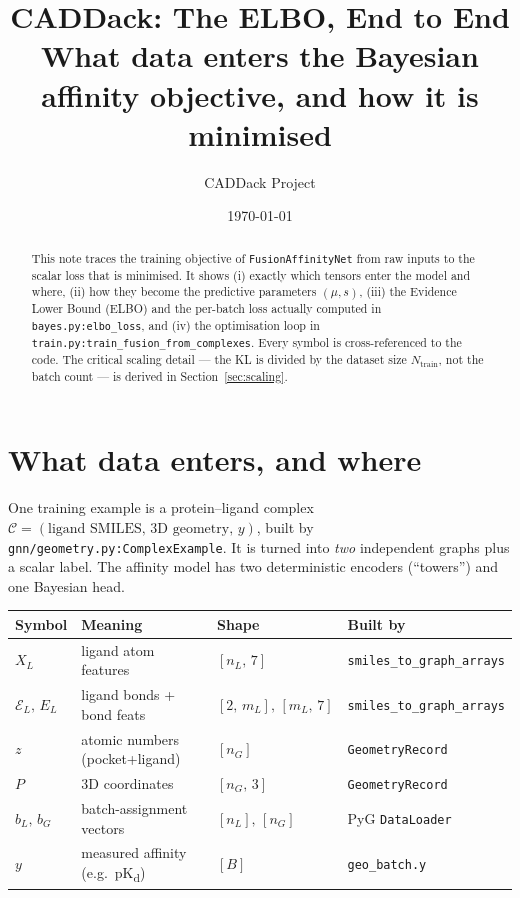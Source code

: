 \documentclass[11pt,a4paper]{article}
\title{%
  \textbf{CADDack: The ELBO, End to End}\\[6pt]
  \large What data enters the Bayesian affinity objective, and how it is minimised
}
\author{CADDack Project}
\date{\today}
\newcommand{\code}[1]{\texttt{#1}}
\begin{document}
\maketitle
\thispagestyle{fancy}

\begin{abstract}
This note traces the training objective of \code{FusionAffinityNet} from raw inputs
to the scalar loss that is minimised. It shows (i) exactly which tensors enter the
model and where, (ii) how they become the predictive parameters $(\mu, s)$, (iii)
the Evidence Lower Bound (ELBO) and the per-batch loss actually computed in
\code{bayes.py:elbo\_loss}, and (iv) the optimisation loop in
\code{train.py:train\_fusion\_from\_complexes}. Every symbol is cross-referenced to
the code. The critical scaling detail --- the KL is divided by the dataset size
$N_{\text{train}}$, not the batch count --- is derived in Section~\ref{sec:scaling}.
\end{abstract}

\section{What data enters, and where}
\label{sec:data}

One training example is a protein--ligand complex
$\mathcal{C} = (\text{ligand SMILES},\, \text{3D geometry},\, y)$, built by
\code{gnn/geometry.py:ComplexExample}. It is turned into \emph{two} independent
graphs plus a scalar label. The affinity model has two deterministic encoders
(``towers'') and one Bayesian head.

\begin{center}
\small
\renewcommand{\arraystretch}{1.35}
\begin{tabular}{@{}p{2.6cm}p{4.2cm}p{2.4cm}p{4.0cm}@{}}
\toprule
\textbf{Symbol} & \textbf{Meaning} & \textbf{Shape} & \textbf{Built by} \\
\midrule
$X_L$ & ligand atom features & $[n_L,\,7]$ & \code{smiles\_to\_graph\_arrays} \\
$\mathcal{E}_L,\,E_L$ & ligand bonds + bond feats & $[2,\,m_L],\,[m_L,\,7]$ & \code{smiles\_to\_graph\_arrays} \\
$z$ & atomic numbers (pocket+ligand) & $[n_G]$ & \code{GeometryRecord} \\
$P$ & 3D coordinates & $[n_G,\,3]$ & \code{GeometryRecord} \\
$b_L,\,b_G$ & batch-assignment vectors & $[n_L],\,[n_G]$ & PyG \code{DataLoader} \\
$y$ & measured affinity (e.g.\ pK\textsubscript{d}) & $[B]$ & \code{geo\_batch.y} \\
\bottomrule
\end{tabular}
\end{center}
\end{document}
